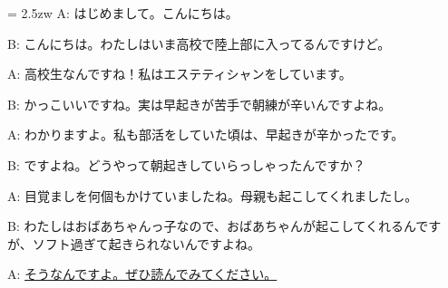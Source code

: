 \documentclass[11pt]{amsart}
\title{}
\author{}
\newenvironment{hangall}[1]{\hangindent = 2.5zw\everypar{\hangindent = 2.5zw}}{}
\begin{document}
\maketitle
\begin{hangall}{}%
A: はじめまして。こんにちは。

B: こんにちは。わたしはいま高校で陸上部に入ってるんですけど。

A: 高校生なんですね！私はエステティシャンをしています。

B: かっこいいですね。実は早起きが苦手で朝練が辛いんですよね。

A: わかりますよ。私も部活をしていた頃は、早起きが辛かったです。

B: ですよね。どうやって朝起きしていらっしゃったんですか？

A: 目覚ましを何個もかけていましたね。母親も起こしてくれましたし。

B: わたしはおばあちゃんっ子なので、おばあちゃんが起こしてくれるんですが、ソフト過ぎて起きられないんですよね。

A: \ul{そうなんですよ。ぜひ読んでみてください。}\end{hangall}
\end{document}
